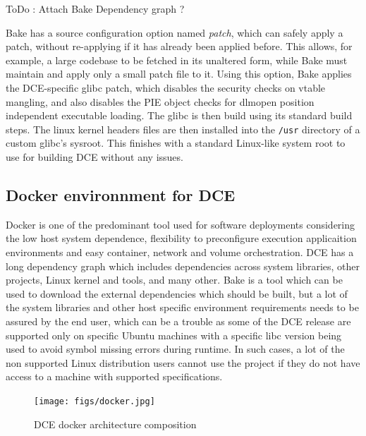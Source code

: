 \documentclass{sig-alternate}
\begin{document}
ToDo : Attach Bake Dependency graph ? 

Bake has a source configuration option named \textit{patch}, which can safely apply a patch, without re-applying if it has already been applied before.  This allows, for example, a large codebase to be fetched in its unaltered form, while Bake must maintain and apply only a small patch file to it.
Using this option, Bake applies the DCE-specific glibc patch, which disables the security checks on vtable mangling, and also disables the 
PIE object checks for dlmopen position independent executable loading. The glibc is then build using its standard build steps. The linux kernel headers
files are then installed into the \texttt{/usr} directory of a custom glibc's sysroot. This finishes with a standard Linux-like system root to use for building 
DCE without any issues. 


\subsection{Docker environnment for DCE}
Docker is one of the predominant tool used for software deployments considering the low host system dependence, flexibility to preconfigure execution 
applicaition environments and easy container, network and volume orchestration. DCE has a long dependency graph which includes dependencies across 
system libraries, other projects, Linux kernel and tools, and many other. Bake is a tool which can be used to download the external dependencies 
which should be built, but a lot of the system libraries and other host specific environment requirements needs to be assured by the end user, which
can be a trouble as some of the DCE release are supported only on specific Ubuntu machines with a specific libc version being used to avoid symbol 
missing errors during runtime. In such cases, a lot of the non supported Linux distribution users cannot use the project if they do not have access 
to a machine with supported specifications. 


\begin{figure}[!htb]
  \centering
    \texttt{[image: figs/docker.jpg]}

  \caption{DCE docker architecture composition}
  \label{fig:docker}
\end{figure}
\end{document}
